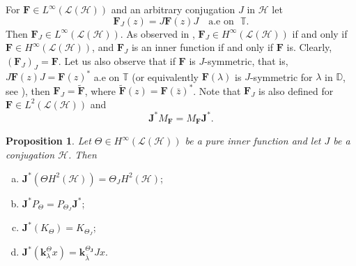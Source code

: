 \documentclass[11pt]{amsart}
\numberwithin{equation}{section}
\newcommand{\hsp}{\mathcal{H}}
\newcommand{\oL }{\mathcal{L}(\hsp) }
\newcommand{\ke}{{\mathbf{k}}}
\newcommand{\F}{{\mathbf{F}}}
\newcommand{\J}{{\mathbf{J}}}
\newtheorem{proposition}[theorem]{Proposition}
\theoremstyle{definition}
\numberwithin{equation}{section}
\begin{document}
For $\F\in L^\infty(\oL)$ and an arbitrary conjugation $J$ in $\hsp$ let
\begin{equation}\label{F}
\F_J(z)=J\F(z)J\quad \text{a.e on}~~~ \mathbb{T}.
\end{equation}
Then $\F_J\in L^\infty(\oL)$. As observed in \cite{CKLP}, $\F_J\in H^\infty(\oL)$ if and only if $\F\in H^\infty(\oL)$, and $\F_J$ is an inner function if and only if $\F$ is. Clearly, $(\F_J)_J=\F.$ Let us also observe that if $\F$ is $J$-symmetric, that is, $J\F(z)J=\F(z)^*$ a.e on $\mathbb{T}$ (or equivalently $\F(\lambda)$ is $J$-symmetric for $\lambda$ in $\mathbb{D}$, see \cite{CKLP}), then $\F_J=\widetilde{\F}$, where $\widetilde{\F}(z)=\F(\bar z)^{*}$.
Note that $\F_J$ is also defined for $\F\in L^{2}(\oL)$ and
\begin{equation}\label{JM}
\J^*M_\F=M_\F\J^*.
\end{equation}
\begin{proposition}\cite{CKLP}\label{a,b,c,d}
Let $\Theta\in H^\infty(\oL)$ be a pure inner function and let $J$ be a conjugation  $\hsp$. Then
\end{proposition}
\begin{enumerate}[(a)]
		\item $\J^*(\Theta H^{2}(\hsp))=\Theta_JH^2(\hsp)$;\label{a}
		\item $\J^*P_\Theta=P_{\Theta_J} \J^*$;\label{b}
\item $\J^*(K_\Theta)=K_{\Theta_J}$;\label{c}
\item $\J^*(\ke_{\lambda}^{\Theta}x)=\ke_{\overline{\lambda}}^{\Theta_{\J}}Jx$.\label{d}
\end{enumerate}
\end{document}
